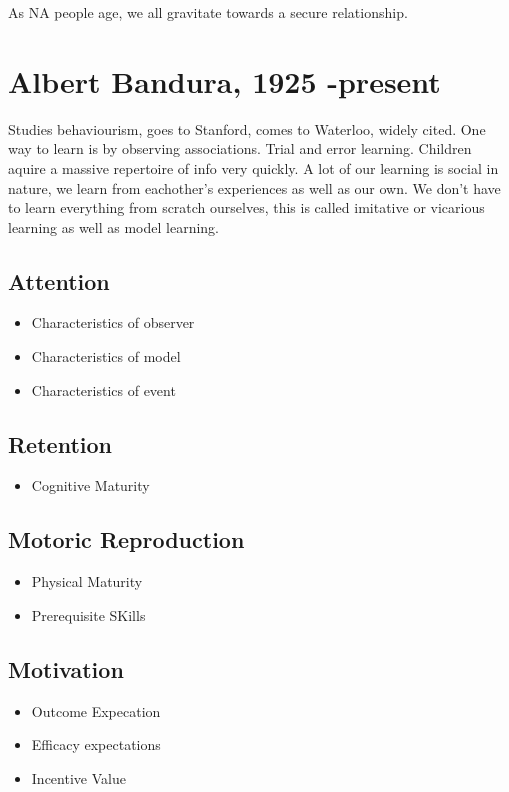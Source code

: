 \documentclass[12pt]{article}
\begin{document}
As NA people age, we all gravitate towards a secure relationship.

\section*{Albert Bandura, 1925 -present}
Studies behaviourism, goes to Stanford, comes to Waterloo, widely cited. One way to learn is by observing associations. Trial and error learning. Children aquire a massive repertoire of info very quickly. A lot of our learning is social in nature, we learn from eachother's experiences as well as our own. We don't have to learn everything from scratch ourselves, this is called imitative or vicarious learning as well as model learning. 

\subsection*{Attention}
\begin{itemize}
\item Characteristics of observer
\item Characteristics of model
\item Characteristics of event
\end{itemize}

\subsection*{Retention}
\begin{itemize}
\item Cognitive Maturity
\end{itemize}

\subsection*{Motoric Reproduction}
\begin{itemize}
\item Physical Maturity
\item Prerequisite SKills
\end{itemize}

\subsection*{Motivation}
\begin{itemize}
\item Outcome Expecation
\item Efficacy expectations
\item Incentive Value
\end{itemize}
\end{document}
